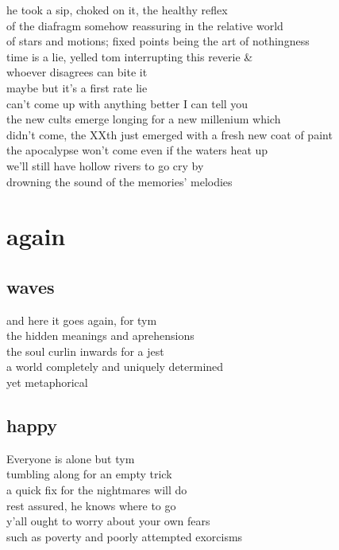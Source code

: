 \documentclass{article}
\begin{document}
he took a sip, choked on it, the healthy reflex\\
of the diafragm somehow reassuring in the relative world\\
of stars and motions; fixed points being the art of nothingness\\
time is a lie, yelled tom interrupting this reverie \&\\
whoever disagrees can bite it\\

maybe but it's a first rate lie\\
can't come up with anything better I can tell you\\
the new cults emerge longing for a new millenium which\\
didn't come, the XXth just emerged with a fresh new coat of paint\\
the apocalypse won't come even if the waters heat up\\
we'll still have hollow rivers to go cry by\\
drowning the sound of the memories' melodies\\

\section{again}
\subsection{waves}
and here it goes again, for tym\\
the hidden meanings and aprehensions\\
the soul curlin inwards for a jest\\
a world completely and uniquely determined\\
yet metaphorical

\subsection{happy}
Everyone is alone but tym\\
tumbling along for an empty trick\\
a quick fix for the nightmares will do\\
rest assured, he knows where to go\\
y'all ought to worry about your own fears\\
such as poverty and poorly attempted exorcisms\\
\end{document}
